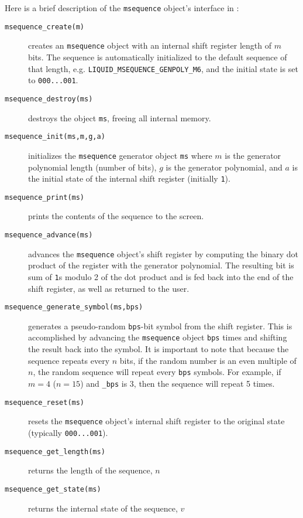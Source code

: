 Here is a brief description of the {\tt msequence} object's interface in
\liquid:
%
\begin{description}
\item[{\tt msequence\_create(m)}]
    creates an {\tt msequence} object with an internal shift register length
    of $m$ bits.
    The sequence is automatically initialized to the default sequence of that
    length, e.g. {\tt LIQUID\_MSEQUENCE\_GENPOLY\_M6}, and the initial state is set
    to {\tt 000...001}.
\item[{\tt msequence\_destroy(ms)}]
    destroys the object {\tt ms}, freeing all internal memory.
\item[{\tt msequence\_init(ms,m,g,a)}]
    initializes the {\tt msequence} generator object {\tt ms} where
    $m$ is the generator polynomial length (number of bits),
    $g$ is the generator polynomial, and
    $a$ is the initial state of the internal shift register (initially
    {\tt  1}).
\item[{\tt msequence\_print(ms)}]
    prints the contents of the sequence to the screen.
\item[{\tt msequence\_advance(ms)}]
    advances the {\tt msequence} object's shift register by computing the
    binary dot product of the register with the generator polynomial.
    The resulting bit is sum of {\tt 1}s modulo 2 of the dot product and is
    fed back into the end of the shift register, as well as returned to the
    user.
\item[{\tt msequence\_generate\_symbol(ms,bps)}]
    generates a pseudo-random {\tt bps}-bit symbol from the shift register.
    This is accomplished by advancing the {\tt msequence} object {\tt bps}
    times and shifting the result back into the symbol.
    It is important to note that because the sequence repeats every $n$ bits,
    if the random number is an even multiple of $n$, the random sequence will
    repeat every {\tt bps} symbols.
    For example, if $m=4$ ($n=15$) and {\tt \_bps} is 3, then the sequence
    will repeat 5 times.
\item[{\tt msequence\_reset(ms)}]
    resets the {\tt msequence} object's internal shift register to the
    original state (typically {\tt 000...001}).
\item[{\tt msequence\_get\_length(ms)}]
    returns the length of the sequence, $n$
\item[{\tt msequence\_get\_state(ms)}]
    returns the internal state of the sequence, $v$
\end{description}
%
